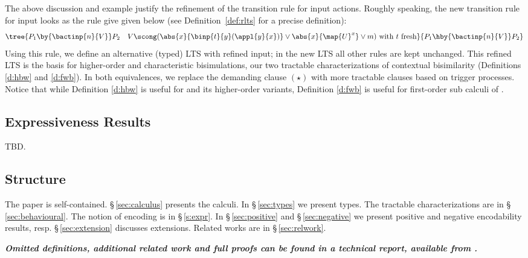 
The above discussion and example justify the refinement of the transition 
rule for input actions. 
Roughly speaking, the new transition rule for input looks as the rule give 
given below (see Definition~\ref{def:rlts} for a precise definition):
\[
		\tree {
P_1 \by{\bactinp{n}{V}} P_2 \quad  V  \scong
(\abs{{x}}{\binp{t}{y} (\appl{y}{{x}})}
 \vee  \abs{{x}}{\map{U}^{{x}}}  \vee m)  \textrm{ with } t \textrm{ fresh} 
		}{
			P_1 \hby{\bactinp{n}{V}} P_2
		}
\]
Using this rule, we define an alternative (typed) LTS
with refined input; in the new LTS all other rules are kept unchanged.
This refined LTS is the basis for 
higher-order and characteristic bisimulations, our 
two tractable characterizations of contextual bisimilarity (Definitions \ref{d:hbw} and \ref{d:fwb}).
In both equivalences, we replace the demanding   clause $(\star)$ with more tractable 
clauses based on trigger processes. Notice that while Definition \ref{d:hbw} is useful for \HOp and its higher-order variants,
Definition \ref{d:fwb} is useful for first-order sub calculi of \HOp.

\subsection{Expressiveness Results}
TBD.

\subsection{Structure}
The paper is self-contained. 
\S\,\ref{sec:calculus} presents the calculi.
In 
\S\,\ref{sec:types} we present types.
The tractable characterizations are in \S\,\ref{sec:behavioural}.
The notion of encoding is in \S\,\ref{s:expr}.
In \S\,\ref{sec:positive} and \S\,\ref{sec:negative}
we present positive and negative encodability results, resp.
\S\,\ref{sec:extension} discusses extensions.
Related works are in \S\,\ref{sec:relwork}.


{\bf\em Omitted definitions, additional related work and full proofs can be found 
in a technical report, available from \cite{KouzapasPY15}.} 
